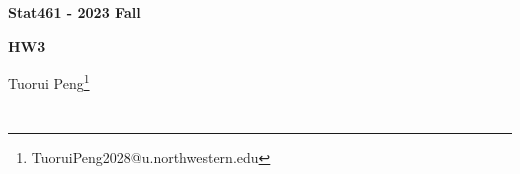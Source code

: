 \documentclass[11pt,a4paper]{ctexart}
\numberwithin{equation}{section}%
\begin{document}
\begin{center}\thispagestyle{plain}

{\LARGE\textbf{Stat461 - 2023 Fall}}

{\Large\textbf{HW3}}

Tuorui Peng\footnote{TuoruiPeng2028@u.northwestern.edu}
\end{center}

\thispagestyle{myheadings}
\pagestyle{myheadings}






\section{}

\subsection{}
\end{document}
